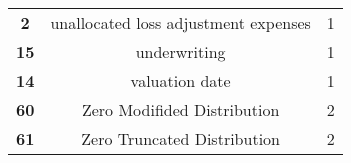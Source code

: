 \documentclass[]{book}
\theoremstyle{definition}
\theoremstyle{definition}
\theoremstyle{definition}
\theoremstyle{remark}
\begin{document}
\begin{longtable}[]{@{}ccc@{}}
\begin{minipage}[t]{0.11\columnwidth}\centering\strut
\textbf{2}\strut
\end{minipage} & \begin{minipage}[t]{0.42\columnwidth}\centering\strut
unallocated loss adjustment expenses\strut
\end{minipage} & \begin{minipage}[t]{0.29\columnwidth}\centering\strut
1\strut
\end{minipage}\tabularnewline
\begin{minipage}[t]{0.11\columnwidth}\centering\strut
\textbf{15}\strut
\end{minipage} & \begin{minipage}[t]{0.42\columnwidth}\centering\strut
underwriting\strut
\end{minipage} & \begin{minipage}[t]{0.29\columnwidth}\centering\strut
1\strut
\end{minipage}\tabularnewline
\begin{minipage}[t]{0.11\columnwidth}\centering\strut
\textbf{14}\strut
\end{minipage} & \begin{minipage}[t]{0.42\columnwidth}\centering\strut
valuation date\strut
\end{minipage} & \begin{minipage}[t]{0.29\columnwidth}\centering\strut
1\strut
\end{minipage}\tabularnewline
\begin{minipage}[t]{0.11\columnwidth}\centering\strut
\textbf{60}\strut
\end{minipage} & \begin{minipage}[t]{0.42\columnwidth}\centering\strut
Zero Modifided Distribution\strut
\end{minipage} & \begin{minipage}[t]{0.29\columnwidth}\centering\strut
2\strut
\end{minipage}\tabularnewline
\begin{minipage}[t]{0.11\columnwidth}\centering\strut
\textbf{61}\strut
\end{minipage} & \begin{minipage}[t]{0.42\columnwidth}\centering\strut
Zero Truncated Distribution\strut
\end{minipage} & \begin{minipage}[t]{0.29\columnwidth}\centering\strut
2\strut
\end{minipage}\tabularnewline
\bottomrule
\end{longtable}


\end{document}

